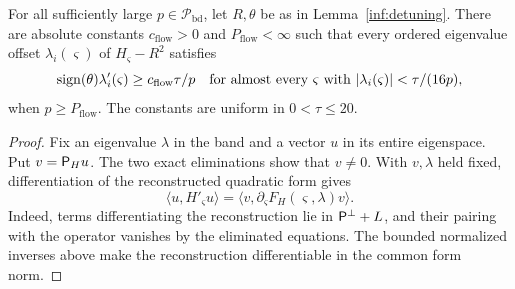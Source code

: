 \begin{theorem}\label{inf:flow-theorem}
For all sufficiently large $p\in\mathcal P_{\mathrm{bd}}$, let $R,\theta$
be as in Lemma~\ref{inf:detuning}. There are absolute constants
$c_{\mathrm{flow}}>0$ and $P_{\mathrm{flow}}<\infty$ such that
every ordered eigenvalue offset $\lambda_i(\varsigma)$ of $H_\varsigma-R^2$
satisfies
\begin{equation}\label{inf:flow-conclusion}
 \operatorname{sign}(\theta)\lambda_i'(\varsigma)
 \ge c_{\mathrm{flow}}\tau/p
 \quad\hbox{for almost every }\varsigma\hbox{ with }
 |\lambda_i(\varsigma)|<\tau/(16p),
\end{equation}
when $p\ge P_{\mathrm{flow}}$. The constants are uniform in
$0<\tau\le20$.
\end{theorem}
\begin{proof}
Fix an eigenvalue $\lambda$ in the band and a vector $u$ in its
entire eigenspace. Put $v=\mathsf P_Hu$. The two exact eliminations show
that $v\ne0$. With $v,\lambda$ held fixed, differentiation of the
reconstructed quadratic form gives
\begin{equation}\label{inf:feshbach-derivative}
 \langle u,H'_{\varsigma}u\rangle
 =\langle v,\partial_{\varsigma}F_H(\varsigma,\lambda)v\rangle.
\end{equation}
Indeed, terms differentiating the reconstruction lie in
$\mathsf P^\perp+L$, and their pairing with the operator vanishes by the
eliminated equations. The bounded normalized inverses above
make the reconstruction differentiable in the common form norm.


\end{proof}
